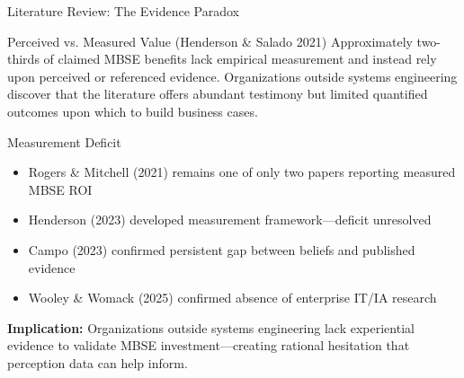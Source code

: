 \documentclass{beamer}
\begin{document}
\begin{frame}[allowframebreaks]{Literature Review: The Evidence Paradox}
  \begin{block}{Perceived vs. Measured Value (Henderson \& Salado 2021)}
    Approximately two-thirds of claimed MBSE benefits lack empirical measurement and instead rely upon perceived or referenced evidence. Organizations outside systems engineering discover that the literature offers abundant testimony but limited quantified outcomes upon which to build business cases.
  \end{block}

  \begin{block}{Measurement Deficit}
    \begin{itemize}
      \item Rogers \& Mitchell (2021) remains one of only two papers reporting measured MBSE ROI
      \item Henderson (2023) developed measurement framework---deficit unresolved
      \item Campo (2023) confirmed persistent gap between beliefs and published evidence
      \item Wooley \& Womack (2025) confirmed absence of enterprise IT/IA research
    \end{itemize}
  \end{block}

  \vspace{0.2cm}
  \textbf{Implication:} Organizations outside systems engineering lack experiential evidence to validate MBSE investment---creating rational hesitation that perception data can help inform.
\end{frame}
\end{document}
